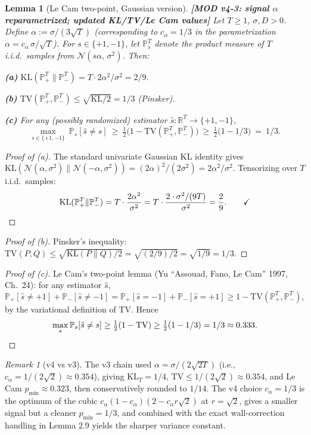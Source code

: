 \documentclass[11pt,a4paper]{article}
\theoremstyle{plain}
\newtheorem{lemma}[theorem]{Lemma}
\theoremstyle{definition}
\theoremstyle{remark}
\newtheorem{remark}[theorem]{Remark}
\newcommand{\R}{\mathbb{R}}
\newcommand{\Prb}{\mathbb{P}}
\newcommand{\KL}{\mathrm{KL}}
\newcommand{\TV}{\mathrm{TV}}
\begin{document}
\begin{lemma}[Le Cam two-point, Gaussian version]
\label{lem:1.4}
\textbf{[MOD v4-3: signal $\alpha$ reparametrized; updated KL/TV/Le Cam values]} Let $T \geq 1$, $\sigma, D > 0$. Define $\alpha := \sigma/(3\sqrt T)$ (corresponding to $c_\alpha = 1/3$ in the parametrization $\alpha = c_\alpha\,\sigma/\sqrt T$). For $s \in \{+1, -1\}$, let $\Prb_s^T$ denote the product measure of $T$ i.i.d.\ samples from $\mathcal{N}(s\alpha,\,\sigma^2)$. Then:

\textbf{(a)} $\KL(\Prb_+^T \| \Prb_-^T) = T \cdot 2\alpha^2/\sigma^2 = 2/9$.

\textbf{(b)} $\TV(\Prb_+^T, \Prb_-^T) \leq \sqrt{\KL/2} = 1/3$ (Pinsker).

\textbf{(c)} For any (possibly randomized) estimator $\hat s : \R^T \to \{+1, -1\}$,
\[
\max_{s \in \{+1,-1\}}\ \Prb_s[\hat s \neq s]\ \geq\ \tfrac{1}{2}\bigl(1 - \TV(\Prb_+^T, \Prb_-^T)\bigr)\ \geq\ \tfrac{1}{2}\bigl(1 - 1/3\bigr)\ =\ 1/3.
\]
\end{lemma}

\begin{proof}[Proof of (a)]
The standard univariate Gaussian KL identity gives $\KL(\mathcal{N}(\alpha, \sigma^2) \| \mathcal{N}(-\alpha, \sigma^2)) = (2\alpha)^2/(2\sigma^2) = 2\alpha^2/\sigma^2$. Tensorizing over $T$ i.i.d.\ samples:
\[
\KL(\Prb_+^T \| \Prb_-^T) = T \cdot \frac{2\alpha^2}{\sigma^2} = T \cdot \frac{2 \cdot \sigma^2/(9T)}{\sigma^2} = \frac{2}{9}. \qquad\checkmark \qedhere
\]
\end{proof}

\begin{proof}[Proof of (b)]
Pinsker's inequality: $\TV(P, Q) \leq \sqrt{\KL(P \| Q)/2} = \sqrt{(2/9)/2} = \sqrt{1/9} = 1/3$.
\end{proof}

\begin{proof}[Proof of (c)]
Le Cam's two-point lemma (Yu ``Assouad, Fano, Le Cam'' 1997, Ch.\ 24): for any estimator $\hat s$,
\[
\Prb_+[\hat s \neq +1] + \Prb_-[\hat s \neq -1] = \Prb_+[\hat s = -1] + \Prb_-[\hat s = +1] \geq 1 - \TV(\Prb_+^T, \Prb_-^T),
\]
by the variational definition of TV. Hence
\[
\max_{s}\Prb_s[\hat s \neq s] \geq \tfrac{1}{2}(1 - \TV) \geq \tfrac{1}{2}(1 - 1/3) = 1/3 \approx 0.333. \qedhere
\]
\end{proof}

\begin{remark}[v4 vs v3]
The v3 chain used $\alpha = \sigma/(2\sqrt{2T})$ (i.e., $c_\alpha = 1/(2\sqrt 2) \approx 0.354$), giving $\KL_T = 1/4$, $\TV \le 1/(2\sqrt 2) \approx 0.354$, and Le Cam $p_{\min} \approx 0.323$, then conservatively rounded to $1/14$. The v4 choice $c_\alpha = 1/3$ is the optimum of the cubic $c_\alpha(1-c_\alpha)(2 - c_\alpha r\sqrt 2)$ at $r = \sqrt 2$, gives a smaller signal but a cleaner $p_{\min} = 1/3$, and combined with the exact wall-correction handling in Lemma 2.9 yields the sharper variance constant.
\end{remark}
\end{document}
